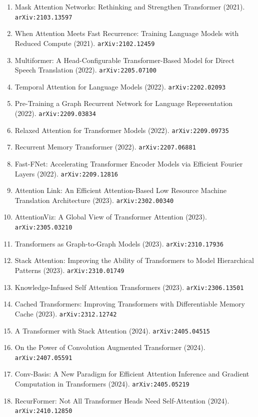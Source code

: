\documentclass[11pt]{article}
\begin{document}
\begin{enumerate}
  \item Mask Attention Networks: Rethinking and Strengthen Transformer (2021). \texttt{arXiv:2103.13597}
  \item When Attention Meets Fast Recurrence: Training Language Models with
  Reduced Compute (2021). \texttt{arXiv:2102.12459}
  \item Multiformer: A Head-Configurable Transformer-Based Model for Direct
  Speech Translation (2022). \texttt{arXiv:2205.07100}
  \item Temporal Attention for Language Models (2022). \texttt{arXiv:2202.02093}
  \item Pre-Training a Graph Recurrent Network for Language Representation (2022). \texttt{arXiv:2209.03834}
  \item Relaxed Attention for Transformer Models (2022). \texttt{arXiv:2209.09735}
  \item Recurrent Memory Transformer (2022). \texttt{arXiv:2207.06881}
  \item Fast-FNet: Accelerating Transformer Encoder Models via Efficient Fourier
  Layers (2022). \texttt{arXiv:2209.12816}
  \item Attention Link: An Efficient Attention-Based Low Resource Machine
  Translation Architecture (2023). \texttt{arXiv:2302.00340}
  \item AttentionViz: A Global View of Transformer Attention (2023). \texttt{arXiv:2305.03210}
  \item Transformers as Graph-to-Graph Models (2023). \texttt{arXiv:2310.17936}
  \item Stack Attention: Improving the Ability of Transformers to Model
  Hierarchical Patterns (2023). \texttt{arXiv:2310.01749}
  \item Knowledge-Infused Self Attention Transformers (2023). \texttt{arXiv:2306.13501}
  \item Cached Transformers: Improving Transformers with Differentiable Memory
  Cache (2023). \texttt{arXiv:2312.12742}
  \item A Transformer with Stack Attention (2024). \texttt{arXiv:2405.04515}
  \item On the Power of Convolution Augmented Transformer (2024). \texttt{arXiv:2407.05591}
  \item Conv-Basis: A New Paradigm for Efficient Attention Inference and
  Gradient Computation in Transformers (2024). \texttt{arXiv:2405.05219}
  \item RecurFormer: Not All Transformer Heads Need Self-Attention (2024). \texttt{arXiv:2410.12850}

\end{enumerate}
\end{document}

